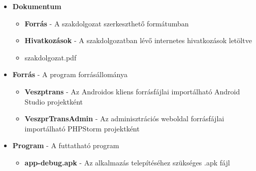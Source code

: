\documentclass[a4paper,oneside,10pt]{report}
\begin{document}
\begin{itemize}
\item \textbf{Dokumentum}
	\begin{itemize}
		\item \textbf{Forrás} - A szakdolgozat szerkeszthető formátumban
		\item \textbf{Hivatkozások} - A szakdolgozatban lévő internetes hivatkozások letöltve
		\item szakdolgozat.pdf
	\end{itemize}
\item \textbf{Forrás} - A program forrásállománya
	\begin{itemize}
		\item \textbf{Veszptrans} - Az Androidos kliens forrásfájlai importálható Android Studio projektként
		\item \textbf{VeszprTransAdmin} - Az adminisztrációs weboldal forrásfájlai importálható PHPStorm projektként
	\end{itemize}
\item \textbf{Program} - A futtatható program
	\begin{itemize}
		\item \textbf{app-debug.apk} - Az alkalmazás telepítéséhez szükséges .apk fájl
	\end{itemize}
\end{itemize}


\appendix

\end{document}
